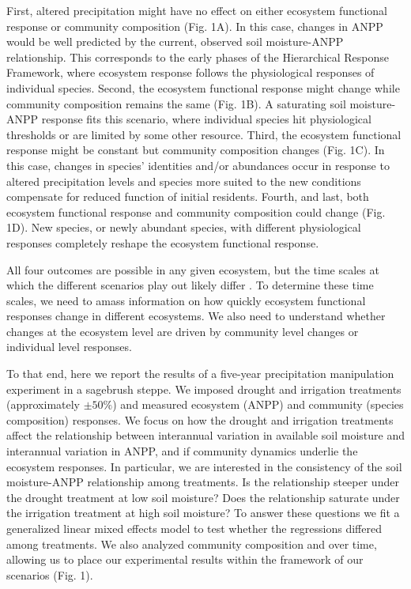 \documentclass[fleqn,10pt,lineno]{wlpeerj} %
\begin{document}
First, altered precipitation might have no effect on either ecosystem
functional response or community composition (Fig. 1A). In this case,
changes in ANPP would be well predicted by the current, observed soil
moisture-ANPP relationship. This corresponds to the early phases of the
Hierarchical Response Framework, where ecosystem response follows the
physiological responses of individual species. Second, the ecosystem
functional response might change while community composition remains the
same (Fig. 1B). A saturating soil moisture-ANPP response fits this
scenario, where individual species hit physiological thresholds or are
limited by some other resource. Third, the ecosystem functional response
might be constant but community composition changes (Fig. 1C). In this
case, changes in species' identities and/or abundances occur in response
to altered precipitation levels and species more suited to the new
conditions compensate for reduced function of initial residents. Fourth,
and last, both ecosystem functional response and community composition
could change (Fig. 1D). New species, or newly abundant species, with
different physiological responses completely reshape the ecosystem
functional response.

All four outcomes are possible in any given ecosystem, but the time
scales at which the different scenarios play out likely differ
\citep{Smith2009, Wilcox2016, Knapp2017}. To determine these time
scales, we need to amass information on how quickly ecosystem functional
responses change in different ecosystems. We also need to understand
whether changes at the ecosystem level are driven by community level
changes or individual level responses.

To that end, here we report the results of a five-year precipitation
manipulation experiment in a sagebrush steppe. We imposed drought and
irrigation treatments (approximately \(\pm50\%\)) and measured ecosystem
(ANPP) and community (species composition) responses. We focus on how
the drought and irrigation treatments affect the relationship between
interannual variation in available soil moisture and interannual
variation in ANPP, and if community dynamics underlie the ecosystem
responses. In particular, we are interested in the consistency of the
soil moisture-ANPP relationship among treatments. Is the relationship
steeper under the drought treatment at low soil moisture? Does the
relationship saturate under the irrigation treatment at high soil
moisture? To answer these questions we fit a generalized linear mixed
effects model to test whether the regressions differed among treatments.
We also analyzed community composition and
 over
time, allowing us to place our experimental results within the framework
of our scenarios (Fig. 1).
\end{document}
